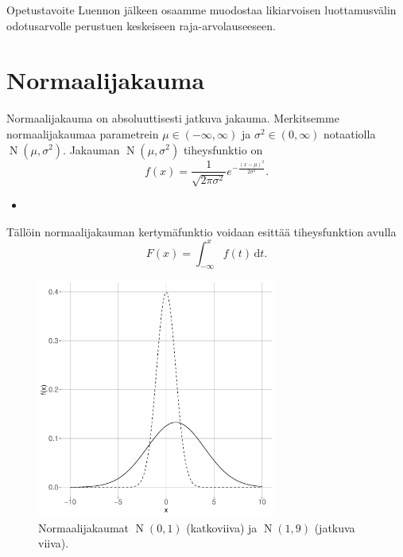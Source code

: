 \documentclass{beamer}
\DeclareMathOperator{\n}{\mathrm N}
\begin{document}

\begin{frame}{Opetustavoite}
  Luennon jälkeen osaamme muodostaa likiarvoisen luottamusvälin odotusarvolle
  perustuen keskeiseen raja-arvolauseeseen.
\end{frame}


\section{Normaalijakauma}

\begin{frame}
  Normaalijakauma on absoluuttisesti jatkuva jakauma. Merkitsemme
  normaalijakaumaa parametrein $\mu\in(-\infty, \infty)$ ja
  $\sigma^2\in(0,\infty)$ notaatiolla $\n\left(\mu, \sigma^2\right)$. Jakauman
  $\n\left(\mu, \sigma^2\right)$ tiheysfunktio on
  \begin{equation*}
    f(x) = \frac{1}{\sqrt{2\pi\sigma^2}} e^{-\frac{\left(x-\mu\right)^2}
    {2\sigma^2}}.
  \end{equation*}
  \pause
  \begin{itemize}
    \item[]
  \end{itemize}
  Tällöin normaalijakauman kertymäfunktio voidaan esittää tiheysfunktion avulla
  \begin{equation*}
    F\left(x\right) = \int_{-\infty}^{x} f(t)\,\mathrm{d}t.
  \end{equation*}
\end{frame}


\begin{frame}
  \begin{center}
    \begin{figure}
      \includegraphics[width=0.7\textwidth, height=0.7\textwidth]{normal}
      \caption{Normaalijakaumat $\n\left(0,1\right)$ (katkoviiva) ja $\n\left(1, 9\right)$ (jatkuva viiva).}
    \end{figure}
  \end{center}
\end{frame}
\end{document}
